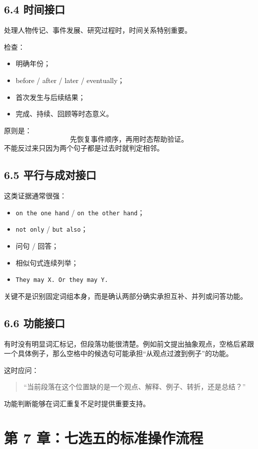 \documentclass[11pt,a4paper]{ctexart}
\begin{document}
\subsection{6.4 时间接口}
处理人物传记、事件发展、研究过程时，时间关系特别重要。

检查：
\begin{itemize}
  \item 明确年份；
  \item before / after / later / eventually；
  \item 首次发生与后续结果；
  \item 完成、持续、回顾等时态意义。
\end{itemize}

原则是：
\[
\boxed{\text{先恢复事件顺序，再用时态帮助验证。}}
\]
不能反过来只因为两个句子都是过去时就判定相邻。

\subsection{6.5 平行与成对接口}
这类证据通常很强：
\begin{itemize}
  \item \texttt{on the one hand} / \texttt{on the other hand}；
  \item \texttt{not only} / \texttt{but also}；
  \item 问句 / 回答；
  \item 相似句式连续列举；
  \item \texttt{They may X. Or they may Y.}
\end{itemize}

关键不是识别固定词组本身，而是确认两部分确实承担互补、并列或问答功能。

\subsection{6.6 功能接口}
有时没有明显词汇标记，但段落功能很清楚。例如前文提出抽象观点，空格后紧跟一个具体例子，那么空格中的候选句可能承担“从观点过渡到例子”的功能。

这时应问：
\begin{quote}
“当前段落在这个位置缺的是一个观点、解释、例子、转折，还是总结？”
\end{quote}
功能判断能够在词汇重复不足时提供重要支持。

\newpage
\section{第 7 章：七选五的标准操作流程}
\end{document}
